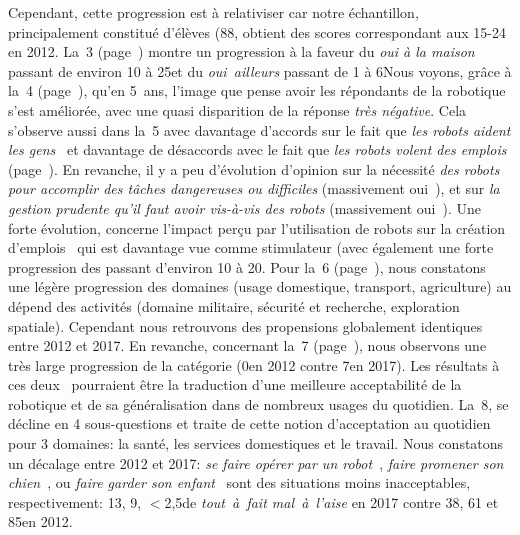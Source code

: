             Cependant, cette progression est à relativiser car notre échantillon, principalement constitué d'élèves (88\prc[)], obtient des scores correspondant aux 15-24 en 2012.
            La~3 ({\footnotesize page~\pageref{QA3}}) montre un progression à la faveur du \textit{oui à la maison} passant de environ 10 à 25\prc et du \textit{oui~ailleurs} passant de 1 à 6\prc[.]
            Nous voyons, grâce à la~4 ({\footnotesize page~\pageref{QA4}}), qu'en 5~ans, l'image que pense avoir les répondants de la robotique s'est améliorée, avec une quasi disparition de la réponse \textit{très négative}.
            Cela s'observe aussi dans la~5 avec davantage d'accords sur le fait que \textit{les robots aident les gens}~ et davantage de désaccords avec le fait que \textit{les robots volent des emplois }({\footnotesize page~\pageref{QA5-2}}).
            En revanche, il y a peu d'évolution d'opinion sur la nécessité \textit{des robots pour accomplir des tâches dangereuses ou difficiles} (massivement oui~), et sur \textit{la gestion prudente qu'il faut avoir vis-à-vis des robots} (massivement oui~). 
            Une forte évolution, concerne l'impact perçu par l'utilisation de robots sur la création d'emplois~ qui est davantage vue comme stimulateur (avec également une forte progression des  passant d'environ 10 à 20\prc[)].
            Pour la~6 ({\footnotesize page~\pageref{QA6}}), nous constatons une légère progression des domaines  (\ie usage domestique, transport, agriculture) au dépend des activités  (\ie domaine militaire, sécurité et recherche, exploration spatiale). Cependant nous retrouvons des propensions globalement identiques entre 2012 et 2017.
            En revanche, concernant la~7 ({\footnotesize page~\pageref{QA7}}), nous observons une très large progression de la catégorie  (0\prc en 2012 contre 7\prc en 2017).
            Les résultats à ces deux~ pourraient être la traduction d'une meilleure acceptabilité de la robotique et de sa généralisation dans de nombreux usages du quotidien.
            La~8, se décline en 4 sous-questions et traite de cette notion d'acceptation au quotidien pour 3 domaines: la santé, les services domestiques et le travail.
            Nous constatons un décalage entre 2012 et 2017:\textit{ se faire opérer par un robot}~, \textit{faire promener son chien}~, ou \textit{faire garder son enfant}~ sont des situations moins inacceptables, respectivement: 13, 9, $<$2,5\prc de \textit{tout~à~fait mal~à~l'aise} en 2017 contre 38, 61 et 85\prc en 2012.
